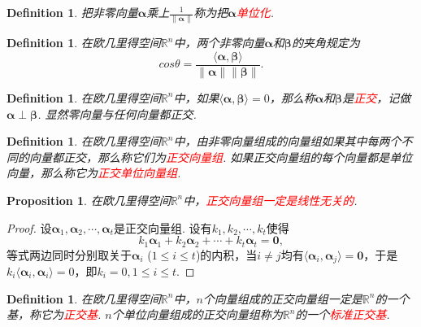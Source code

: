 \documentclass{article}
\newtheorem{proposition}[theorem]{Proposition}
\newtheorem{definition}[theorem]{Definition}
\newcommand{\norm}[1]{\left\lVert#1\right\rVert} %
\newcommand{\mbf}[1]{\bm{#1}}
\newcommand\inp[2]{\langle #1, #2 \rangle} %
\newcommand{\redt}[1]{\textcolor{red}{#1}}
\begin{document}
\begin{definition}
\rm 把非零向量$\mbf{\alpha}$乘上$\frac{1}{\norm{\mbf{\alpha}}}$称为把$\mbf{\alpha}$\redt{单位化}.
\end{definition}

\begin{definition}
\rm 在欧几里得空间$\mathbb{R}^n$中，两个非零向量$\mbf{\alpha}$和$\mbf{\beta}$的夹角规定为
$$
cos \theta = \frac{\inp{\mbf{\alpha}}{\mbf{\beta}}}{\norm{\mbf{\alpha}}\norm{\mbf{\beta}}}.
$$
\end{definition}

\begin{definition}
\rm 在欧几里得空间$\mathbb{R}^n$中，如果$\inp{\mbf{\alpha}}{\mbf{\beta}}=0$，那么称$\mbf{\alpha}$和$\mbf{\beta}$是\redt{正交}，记做$\mbf{\alpha} \perp \mbf{\beta}$. 显然零向量与任何向量都正交.
\end{definition}

\begin{definition}
\rm 在欧几里得空间$\mathbb{R}^n$中，由非零向量组成的向量组如果其中每两个不同的向量都正交，那么称它们为\redt{正交向量组}. 如果正交向量组的每个向量都是单位向量，那么称它为\redt{正交单位向量组}.
\end{definition}

\newpage
\begin{proposition}
\rm 在欧几里得空间$\mathbb{R}^n$中，\redt{正交向量组一定是线性无关的}.
\end{proposition}

\begin{proof}
设$\mbf{\alpha}_1,\mbf{\alpha}_2,\cdots,\mbf{\alpha}_t$是正交向量组. 设有$k_1,k_2,\cdots,k_t$使得
$$
k_1\mbf{\alpha}_1 + k_2\mbf{\alpha}_2 + \cdots + k_t\mbf{\alpha}_t = \mbf{0},
$$
等式两边同时分别取关于$\mbf{\alpha}_i$ ($1\leq i \leq t$)的内积，当$i \neq j$均有$\inp{\mbf{\alpha}_i}{\mbf{\alpha}_j} = \mbf{0}$，于是$k_i\inp{\mbf{\alpha}_i}{\mbf{\alpha}_i} = 0$，即$k_i = 0, 1 \leq i \leq t$.
\end{proof}

\begin{definition}
\rm 在欧几里得空间$\mathbb{R}^n$中，$n$个向量组成的正交向量组一定是$\mathbb{R}^n$的一个基，称它为\redt{正交基}. $n$个单位向量组成的正交向量组称为$\mathbb{R}^n$的一个\redt{标准正交基}.
\end{definition}
\end{document}
